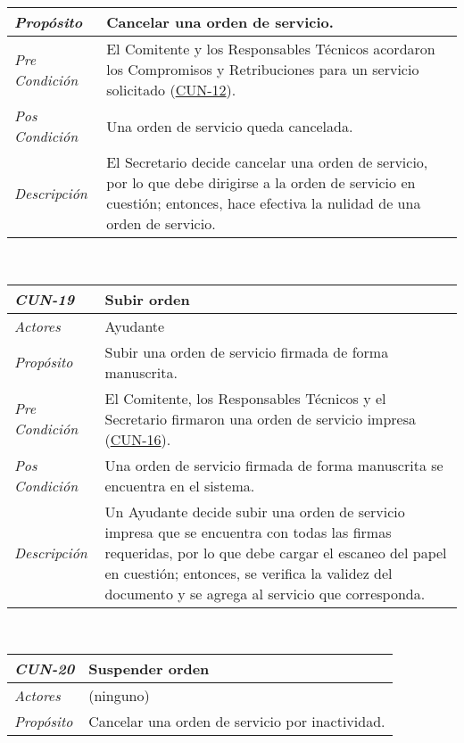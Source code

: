 \begin{center}
{\begin{tabular}{ | p{3cm} | p{12.5cm} | }
	\hline
	\raggedleft \textit{Prop\'osito} & Cancelar una orden
	de servicio. \\
	\hline
	\raggedleft \textit{Pre Condici\'on} & El Comitente y
	los Responsables T\'ecnicos acordaron los Compromisos
	y Retribuciones para un servicio solicitado
	(\hyperlink{CUN-12}{CUN-12}). \\
	\hline
	\raggedleft \textit{Pos Condici\'on} & Una orden de
	servicio queda cancelada. \\
	\hline
	\raggedleft \textit{Descripci\'on} &
	El Secretario decide cancelar una orden de servicio,
	por lo que debe dirigirse a la orden de servicio en
	cuesti\'on; entonces, hace efectiva la nulidad de
	una orden de servicio. \\
	\hline
\end{tabular}} \\[1cm]
\hypertarget{CUN-19}{%
\begin{tabular}{ | p{3cm} | p{12.5cm} | }
	\hline
	\rowcolor{lightgray}
	\hfil \textbf{\textit{CUN-19}} &
	\hfil \textbf{Subir orden} \\
	\hline
	\raggedleft \textit{Actores} & Ayudante \\
	\hline
	\raggedleft \textit{Prop\'osito} & Subir una orden
	de servicio firmada de forma manuscrita. \\
	\hline
	\raggedleft \textit{Pre Condici\'on} & El Comitente,
	los Responsables T\'ecnicos y el Secretario firmaron
	una orden de servicio impresa
	(\hyperlink{CUN-16}{CUN-16}). \\
	\hline
	\raggedleft \textit{Pos Condici\'on} & Una orden de
	servicio firmada de forma manuscrita se encuentra
	en el sistema. \\
	\hline
	\raggedleft \textit{Descripci\'on} &
	Un Ayudante decide subir una orden de servicio impresa
	que se encuentra con todas las firmas requeridas,
	por lo que debe cargar el escaneo del papel en cuesti\'on;
	entonces, se verifica la validez del documento y
	se agrega al servicio que corresponda. \\
	\hline
\end{tabular}} \\[1cm]
\hypertarget{CUN-20}{%
\begin{tabular}{ | p{3cm} | p{12.5cm} | }
	\hline
	\rowcolor{lightgray}
	\hfil \textbf{\textit{CUN-20}} &
	\hfil \textbf{Suspender orden} \\
	\hline
	\raggedleft \textit{Actores} & (ninguno) \\
	\hline
	\raggedleft \textit{Prop\'osito} & Cancelar una orden de
	servicio por inactividad. \\

\end{tabular}}
\end{center}
